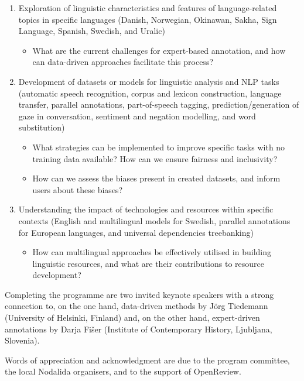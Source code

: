 \begin{enumerate}
    \item Exploration of linguistic characteristics and features of language-related topics in specific languages (Danish, Norwegian, Okinawan, Sakha, Sign Language, Spanish, Swedish, and Uralic)
    \begin{itemize}
        \item What are the current challenges for expert-based annotation, and how can data-driven approaches facilitate this process?
    \end{itemize}
    \item Development of datasets or models for linguistic analysis and NLP tasks (automatic speech recognition, corpus and lexicon construction, language transfer, parallel annotations, part-of-speech tagging, prediction/generation of gaze in conversation, sentiment and negation modelling, and word substitution)
    \begin{itemize}
        \item What strategies can be implemented to improve specific tasks with no training data available? How can we ensure fairness and inclusivity?
        \item How can we assess the biases present in created datasets, and inform users about these biases?
    \end{itemize}
    \item Understanding the impact of technologies and resources within specific contexts (English and multilingual models for Swedish, parallel annotations for European languages, and universal dependencies treebanking)
    \begin{itemize}
        \item How can multilingual approaches be effectively utilised in building linguistic resources, and what are their contributions to resource development?
    \end{itemize}    
\end{enumerate}

Completing the programme are two invited keynote speakers with a strong connection to, on the one hand, data-driven methods by Jörg Tiedemann (University of Helsinki, Finland) and, on the other hand, expert-driven annotations by Darja Fišer (Institute of Contemporary History, Ljubljana, Slovenia).
\vspace{2ex}

Words of appreciation and acknowledgment are due to the program committee, the local Nodalida organisers, and to the support of OpenReview.
\vspace{7ex}

